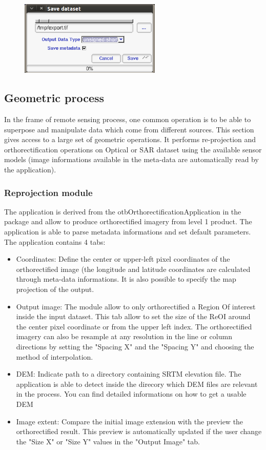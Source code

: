 \begin{figure}
  \center
  \includegraphics[width=0.6\textwidth]{../Art/MonteverdiImages/monteverdi_export_dataset.png}
  \label{fig:concatenate}
\end{figure}

\subsection{Geometric process}
In the frame of remote sensing process, one common operation is to be
able to superpose and manipulate data which come from different
sources.  This section gives access to a large set of geometric
operations.  It performs re-projection and orthorectification
operations on Optical or SAR dataset using the available sensor models
(image informations available in the meta-data are automatically read
by the application).  
\subsubsection{Reprojection module}
The application is derived from the otbOrthorectificationApplication
in the \app package and allow to produce orthorectified imagery from
level 1 product. The application is able to parse metadata
informations and set default parameters. The application contains 4
tabs:

\begin{itemize}
\item Coordinates: Define the center or upper-left pixel coordinates
  of the orthorectified image (the longitude and latitude coordinates
  are calculated through meta-data informations. It is also possible
  to specify the map projection of the output.
\item Output image: The module allow to only orthorectified a Region
  Of interest inside the input dataset. This tab allow to set the size
  of the ReOI around the center pixel coordinate or from the upper
  left index. The orthorectified imagery can also be resample at any
  resolution in the line or column directions by setting the "Spacing
  X" and the "Spacing Y" and choosing the method of interpolation.
\item DEM: Indicate path to a directory containing SRTM elevation
  file. The application is able to detect inside the direcory which
  DEM files are relevant in the process. You can find detailed
  informations on how to get a usable DEM
\item Image extent: Compare the initial image extension with the
  preview the orthorectified result. This preview is automatically
  updated if the user change the "Size X" or "Size Y" values in the
  "Output Image" tab.
\end{itemize}

